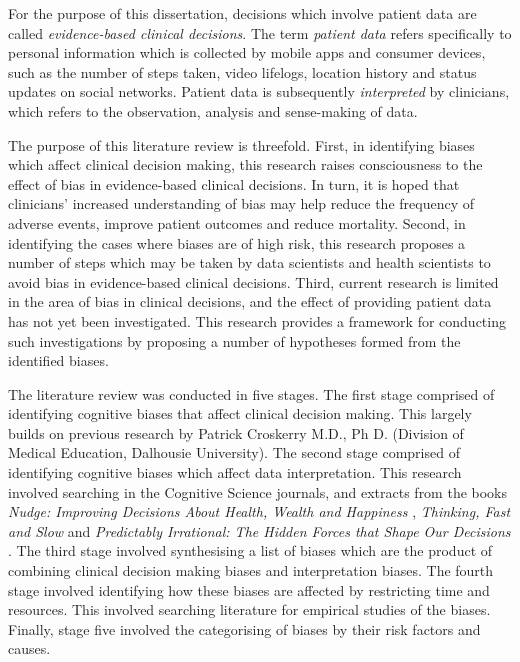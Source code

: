 \documentclass[a4paper]{scrartcl}     %
\begin{document}
  For the purpose of this dissertation, decisions which involve patient data are called \textit{evidence-based clinical decisions}. The term \textit{patient data} refers specifically to personal information which is collected by mobile apps and consumer devices, such as the number of steps taken, video lifelogs, location history and status updates on social networks. Patient data is subsequently \textit{interpreted} by clinicians, which refers to the observation, analysis and sense-making of data.

  The purpose of this literature review is threefold. First, in identifying biases which affect clinical decision making, this research raises consciousness to the effect of bias in evidence-based clinical decisions. In turn, it is hoped that clinicians' increased understanding of bias may help reduce the frequency of adverse events, improve patient outcomes and reduce mortality. Second, in identifying the cases where biases are of high risk, this research proposes a number of steps which may be taken by data scientists and health scientists to avoid bias in evidence-based clinical decisions. Third, current research is limited in the area of bias in clinical decisions, and the effect of providing patient data has not yet been investigated. This research provides a framework for conducting such investigations by proposing a number of hypotheses formed from the identified biases.

  The literature review was conducted in five stages. The first stage comprised of identifying cognitive biases that affect clinical decision making. This largely builds on previous research by Patrick Croskerry M.D., Ph D. (Division of Medical Education, Dalhousie University). The second stage comprised of identifying cognitive biases which affect data interpretation. This research involved searching in the Cognitive Science journals, and extracts from the books \textit{Nudge: Improving Decisions About Health, Wealth and Happiness} \citep{Thaler2012}, \textit{Thinking, Fast and Slow} \citep{Kahneman2012} and \textit{Predictably Irrational: The Hidden Forces that Shape Our Decisions} \citep{Ariely2009}. The third stage involved synthesising a list of biases which are the product of combining clinical decision making biases and interpretation biases. The fourth stage involved identifying how these biases are affected by restricting time and resources. This involved searching literature for empirical studies of the biases. Finally, stage five involved the categorising of biases by their risk factors and causes.
\end{document}
